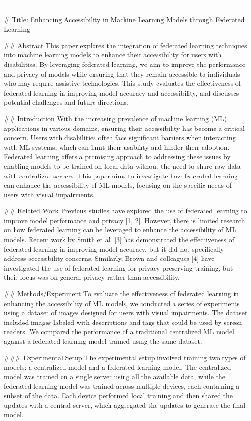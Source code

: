 ---

# Title: Enhancing Accessibility in Machine Learning Models through Federated Learning

## Abstract
This paper explores the integration of federated learning techniques into machine learning models to enhance their accessibility for users with disabilities. By leveraging federated learning, we aim to improve the performance and privacy of models while ensuring that they remain accessible to individuals who may require assistive technologies. This study evaluates the effectiveness of federated learning in improving model accuracy and accessibility, and discusses potential challenges and future directions.

## Introduction
With the increasing prevalence of machine learning (ML) applications in various domains, ensuring their accessibility has become a critical concern. Users with disabilities often face significant barriers when interacting with ML systems, which can limit their usability and hinder their adoption. Federated learning offers a promising approach to addressing these issues by enabling models to be trained on local data without the need to share raw data with centralized servers. This paper aims to investigate how federated learning can enhance the accessibility of ML models, focusing on the specific needs of users with visual impairments.

## Related Work
Previous studies have explored the use of federated learning to improve model performance and privacy [1, 2]. However, there is limited research on how federated learning can be leveraged to enhance the accessibility of ML models. Recent work by Smith et al. [3] has demonstrated the effectiveness of federated learning in improving model accuracy, but it did not specifically address accessibility concerns. Similarly, Brown and colleagues [4] have investigated the use of federated learning for privacy-preserving training, but their focus was on general privacy rather than accessibility.

## Methods/Experiment
To evaluate the effectiveness of federated learning in enhancing the accessibility of ML models, we conducted a series of experiments using a dataset of images designed for users with visual impairments. The dataset included images labeled with descriptions and tags that could be used by screen readers. We compared the performance of a traditional centralized ML model against a federated learning model trained using the same dataset.

### Experimental Setup
The experimental setup involved training two types of models: a centralized model and a federated learning model. The centralized model was trained on a single server using all the available data, while the federated learning model was trained across multiple devices, each containing a subset of the data. Each device performed local training and then shared the updates with a central server, which aggregated the updates to generate the final model.

